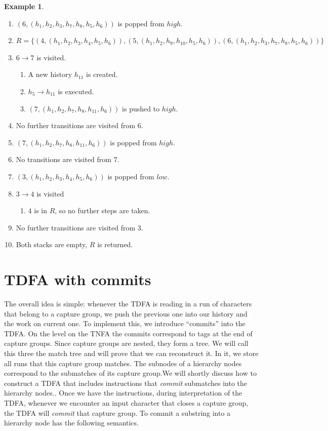 \documentclass[english]{sigplanconf}
\theoremstyle{definition}
\newtheorem{example}{Example}[section]
\begin{document}
\begin{example}
\begin{enumerate}
\item $(6, (h_1, h_2, h_3, h_7, h_8, h_5, h_6))$ is popped from $high$.
\item $R=\{(4, (h_1, h_2, h_3, h_4, h_5, h_6)), (5, (h_1, h_2, h_9, h_{10}, h_5, h_6)), (6, (h_1, h_2, h_3, h_7, h_8, h_5, h_6))\}$
\item $6\rightarrow 7$ is visited.\begin{enumerate}
	\item A new history $h_{11}$ is created.
	\item $h_5\rightarrow h_{11}$ is executed.
	\item $(7, (h_1, h_2, h_7, h_8, h_{11}, h_6))$ is pushed to $high$.
\end{enumerate}
\item No further transitions are visited from $6$.
\item $(7, (h_1, h_2, h_7, h_8, h_{11}, h_6))$ is popped from $high$.
\item No transitions are visited from $7$.
\item $(3, (h_1, h_2, h_3, h_4, h_5, h_6))$ is popped from $low$.
\item $3\rightarrow 4$ is visited \begin{enumerate}
	\item $4$ is in $R$, so no further steps are taken.
\end{enumerate}
\item No further transitions are visited from $3$.
\item Both stacks are empty, $R$ is returned.
\end{enumerate}
\end{example}

\section{TDFA with commits\label{sec:TNFA-with-hierarchical}}

The overall idea is simple: whenever the TDFA is reading in a run
of characters that belong to a capture group, we push the previous
one into our history and the work on current one. To implement this,
we introduce ``commits'' into the TDFA. On the level on the TNFA
the commits correspond to tags at the end of capture groups. Since
capture groups are nested, they form a tree. We will call this three
the match tree and will prove that we can reconstruct it. In it, we
store all runs that this capture group matches. The subnodes of a
hierarchy nodes correspond to the submatches of its capture group.We
will shortly discuss how to construct a TDFA that includes instructions
that \emph{commit} submatches into the hierarchy nodes.. Once we have
the instructions, during interpretation of the TDFA, whenever we encounter
an input character that closes a capture group, the TDFA will \emph{commit}
that capture group. To commit a substring into a hierarchy node has
the following semantics.
\end{document}
